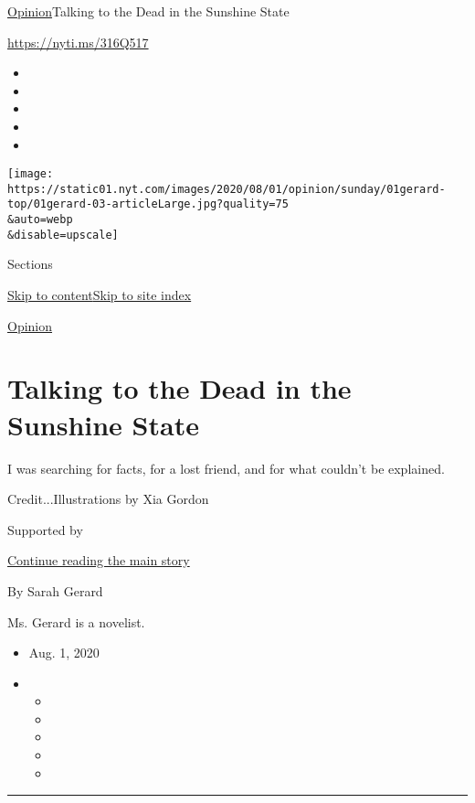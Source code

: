 \href{/section/opinion}{Opinion}\textbar{}Talking to the Dead in the
Sunshine State

\url{https://nyti.ms/316Q517}

\begin{itemize}
\item
\item
\item
\item
\item
\end{itemize}

\texttt{[image: https://static01.nyt.com/images/2020/08/01/opinion/sunday/01gerard-top/01gerard-03-articleLarge.jpg?quality=75\\\&auto=webp\\\&disable=upscale]}

Sections

\protect\hyperlink{site-content}{Skip to
content}\protect\hyperlink{site-index}{Skip to site index}

\href{/section/opinion}{Opinion}

\hypertarget{talking-to-the-dead-in-the-sunshine-state}{%
\section{Talking to the Dead in the Sunshine
State}\label{talking-to-the-dead-in-the-sunshine-state}}

I was searching for facts, for a lost friend, and for what couldn't be
explained.

Credit...Illustrations by Xia Gordon

Supported by

\protect\hyperlink{after-sponsor}{Continue reading the main story}

By Sarah Gerard

Ms. Gerard is a novelist.

\begin{itemize}
\item
  Aug. 1, 2020
\item
  \begin{itemize}
  \item
  \item
  \item
  \item
  \item
  \end{itemize}
\end{itemize}

\begin{center}\rule{0.5\linewidth}{\linethickness}\end{center}

